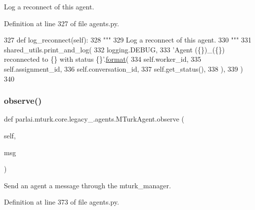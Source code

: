 \begin{DoxyVerb}Log a reconnect of this agent.
\end{DoxyVerb}
 

Definition at line 327 of file agents.\+py.


\begin{DoxyCode}
327     \textcolor{keyword}{def }log\_reconnect(self):
328         \textcolor{stringliteral}{"""}
329 \textcolor{stringliteral}{        Log a reconnect of this agent.}
330 \textcolor{stringliteral}{        """}
331         shared\_utils.print\_and\_log(
332             logging.DEBUG,
333             \textcolor{stringliteral}{'Agent (\{\})\_(\{\}) reconnected to \{\} with status \{\}'}.\hyperlink{namespaceparlai_1_1chat__service_1_1services_1_1messenger_1_1shared__utils_a32e2e2022b824fbaf80c747160b52a76}{format}(
334                 self.worker\_id,
335                 self.assignment\_id,
336                 self.conversation\_id,
337                 self.get\_status(),
338             ),
339         )
340 
\end{DoxyCode}
\mbox{\label{classparlai_1_1mturk_1_1core_1_1legacy__2018_1_1agents_1_1MTurkAgent_ac974df04c688a98380b47bd12f412e4d}} 
\subsubsection{\texorpdfstring{observe()}{observe()}}
{\footnotesize\ttfamily def parlai.\+mturk.\+core.\+legacy\+\_.\+agents.\+M\+Turk\+Agent.\+observe (\begin{DoxyParamCaption}\item[{}]{self,  }\item[{}]{msg }\end{DoxyParamCaption})}

\begin{DoxyVerb}Send an agent a message through the mturk_manager.
\end{DoxyVerb}
 

Definition at line 373 of file agents.\+py.


